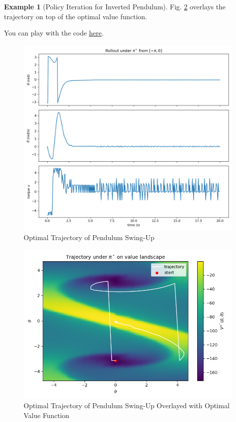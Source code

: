 \documentclass[
]{book}
\theoremstyle{definition}
\theoremstyle{definition}
\newtheorem{example}{Example}[chapter]
\theoremstyle{definition}
\theoremstyle{definition}
\theoremstyle{remark}
\begin{document}
\begin{example}[Policy Iteration for Inverted Pendulum]
Fig. \ref{fig:mdp-pendulum-PI-rollout-trajectory-value} overlays the trajectory on top of the optimal value function.

You can play with the code \href{https://github.com/ComputationalRobotics/2025-ES-AM-158-LECTURE-CODE/blob/main/pendulum_policy_iteration.py}{here}.

\begin{figure}

{\centering \includegraphics[width=0.9\linewidth]{images/MDP/pendulum_optimal_trajectory} 

}

\caption{Optimal Trajectory of Pendulum Swing-Up}\label{fig:mdp-pendulum-PI-rollout-trajectory}
\end{figure}

\begin{figure}

{\centering \includegraphics[width=0.9\linewidth]{images/MDP/pendulum_optimal_trajectory_value} 

}

\caption{Optimal Trajectory of Pendulum Swing-Up Overlayed with Optimal Value Function}\label{fig:mdp-pendulum-PI-rollout-trajectory-value}
\end{figure}

\end{example}
\end{document}

